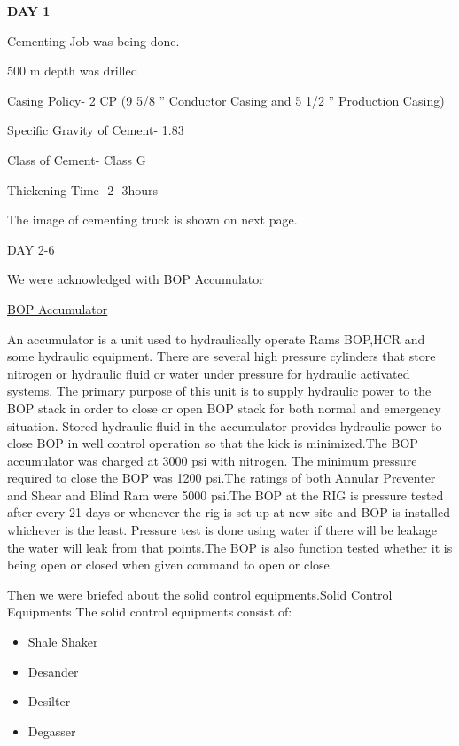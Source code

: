 \documentclass[11pt,a4paper]{article}
\begin{document}
\textbf{DAY \hfill 1}

Cementing Job was being done.

500 m depth was drilled

Casing Policy- 2 CP (9 5/8 ” Conductor Casing and 5 1/2 ” Production Casing)

Specific Gravity of Cement- 1.83

Class of Cement- Class G

Thickening Time- 2- 3hours

The image of cementing truck is shown on next page.

DAY 2-6

We were acknowledged with BOP Accumulator


\underline{BOP Accumulator}

An accumulator is a unit used to hydraulically operate Rams BOP,HCR and some hydraulic equipment. There are several high pressure cylinders that store nitrogen or hydraulic fluid or water under pressure for hydraulic activated systems. The primary purpose of this unit is to supply hydraulic power to the BOP stack in order to close or open BOP stack for both normal and emergency situation. Stored hydraulic fluid in the accumulator provides hydraulic power to close BOP in well control operation so that the kick is minimized.The BOP accumulator was charged at 3000 psi with nitrogen. The minimum pressure required to close the BOP was 1200 psi.The ratings of both Annular Preventer and Shear and Blind Ram were 5000 psi.The BOP at the RIG is pressure tested after every 21 days or whenever the rig is set up at new site and BOP is installed whichever is the least. Pressure test is done using water if there will be leakage the water will leak from that points.The BOP is also function tested whether it is being open or closed when given command to open or close.


\noindent Then we were briefed about the solid control equipments.Solid Control Equipments The solid control equipments consist of:

\begin{itemize}

\item Shale Shaker
\item Desander
\item Desilter
\item Degasser

\end{itemize}

 
\end{document}
